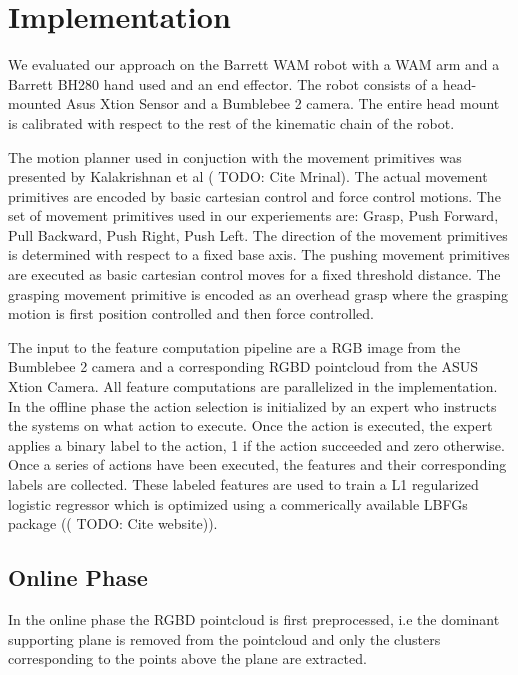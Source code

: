 \section{Implementation}
\label{sec:experiments}
We evaluated our approach on the Barrett WAM robot with a WAM arm and a Barrett BH280 hand used and an end effector. The robot consists of a head-mounted Asus Xtion Sensor and a Bumblebee 2 camera. The entire head mount is calibrated with respect to the rest of the kinematic chain of the robot.

The motion planner used in conjuction with the movement primitives was presented by Kalakrishnan et al (\cite{Javidi12_Journal} TODO: Cite Mrinal). The actual movement primitives are encoded by basic cartesian control and force control motions. The set of movement primitives used in our experiements are: Grasp, Push Forward, Pull Backward, Push Right, Push Left.
The direction of the movement primitives is determined with respect to a fixed base axis. The pushing movement primitives are executed as basic cartesian control moves for a fixed threshold distance. The grasping movement primitive is encoded as an overhead grasp where the grasping motion is first position controlled and then force controlled. 

The input to the feature computation pipeline are a RGB image from the Bumblebee 2 camera and a corresponding RGBD pointcloud from the ASUS Xtion Camera. All feature computations are parallelized in the implementation. In the offline phase the action selection is initialized by an expert who instructs the systems on what action to execute. Once the action is executed, the expert applies a binary label to the action, 1 if the action succeeded and zero otherwise. Once a series of actions have been executed, the features and their corresponding labels are collected.
These labeled features are used to train a L1 regularized logistic regressor which is optimized using a commerically available LBFGs package ((\cite{Javidi12_Journal} TODO: Cite website)).

\subsection{Online Phase}
In the online phase the RGBD pointcloud is first preprocessed, i.e the dominant supporting plane is removed from the pointcloud and only the clusters corresponding to the points above the plane are extracted.


